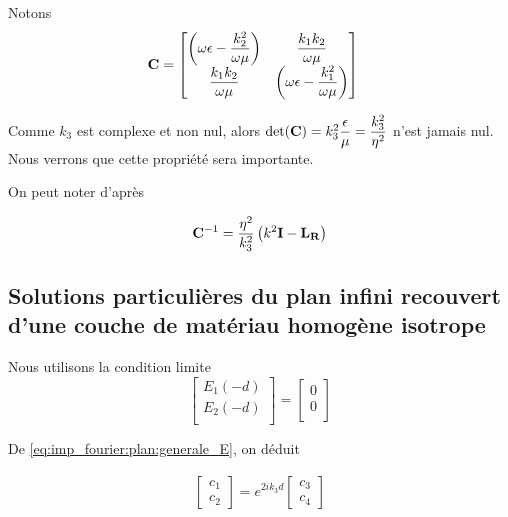 Notons
\begin{align}
    \mathbf{C} &=
    \begin{bmatrix}
        \left(\omega\epsilon-\dfrac{k_2^2}{\omega\mu}\right) & \dfrac{k_1k_2}{\omega\mu}\\
        \dfrac{k_1k_2}{\omega\mu} & \left(\omega\epsilon-\dfrac{k_1^2}{\omega\mu}\right)
    \end{bmatrix}
\end{align}

Comme $k_3$ est complexe et non nul, alors $\det(\mathbf{C}) = k_3^2\dfrac{\epsilon}{\mu}=\dfrac{k_3^2}{\eta^2}$ n'est jamais nul. Nous verrons que cette propriété sera importante.

On peut noter d'après \cite[eq.~(6)]{stupfel_2011}

\begin{equation}
    \mathbf{C}^{-1}= \dfrac{\eta^2}{k_3^2}\left(k^2\mathbf{I} - \mathbf{L_R}\right)
    \label{eq:imp_fourier:plan:C}
\end{equation}

\subsection{Solutions particulières du plan infini recouvert d'une couche de matériau homogène isotrope}

Nous utilisons la condition limite 
\begin{equation}
    \begin{bmatrix}
        E_1(-d)\\
        E_2(-d)\\
    \end{bmatrix}
    =
    \begin{bmatrix}
        0\\
        0\\
    \end{bmatrix}
\end{equation}

De \eqref{eq:imp_fourier:plan:generale_E}, on déduit

\begin{align}
    \begin{bmatrix}
        c_1 \\
        c_2
    \end{bmatrix}
    = e^{2ik_3 d}
    \begin{bmatrix}
        c_3 \\
        c_4
    \end{bmatrix}
\end{align}

